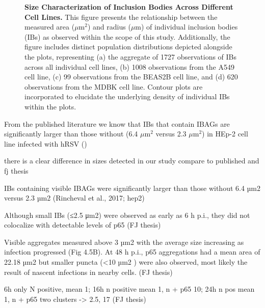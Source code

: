 \begin{figure}
    \caption[Size Characterization of Inclusion Bodies Across Different Cell Lines.]{\textbf{Size Characterization of Inclusion Bodies Across Different Cell Lines.} This figure presents the relationship between the measured area (\(\mu \mbox{m}^2\)) and radius (\(\mu \mbox{m}\)) of individual inclusion bodies (IBs) as observed within the scope of this study. Additionally, the figure includes distinct population distributions depicted alongside the plots, representing (a) the aggregate of 1727 observations of IBs across all individual cell lines, (b) 1008 observations from the A549 cell line, (c) 99 observations from the BEAS2B cell line, and (d) 620 observations from the MDBK cell line. Contour plots are incorporated to elucidate the underlying density of individual IBs within the plots.}
    \label{fig:Size Characterization of Inclusion Bodies Across Different Cell Lines}  
\end{figure}

From the published literature we know that IBs that contain IBAGs are significantly larger than those without (6.4 \(\mu \mbox{m}^2\) versus 2.3 \(\mu \mbox{m}^2\)) in HEp-2 cell line infected with hRSV (\cite{Rincheval2017FunctionalVirus}) 

there is a clear difference in sizes detected in our study
compare to published and fj thesis

IBs containing visible IBAGs were significantly larger than those without 6.4 µm2 versus 2.3 µm2 (Rincheval et al., 2017; hep2)

Although small IBs (≤2.5 μm2) were observed as early as 6 h p.i., they did not colocalize with detectable levels of p65 (FJ thesis)

Visible aggregates measured above 3 µm2 with the average size increasing as infection progressed (Fig 4.5B). At 48 h p.i., p65 aggregations had a mean area of 22.18 µm2 but smaller puncta (<10 µm2 ) were also observed, most likely the result of nascent infections in nearby cells. (FJ thesis)

6h only N positive, mean 1; 16h n positive mean 1, n + p65 10; 24h n pos mean 1, n + p65 two clusters -> 2.5, 17 (FJ thesis)

